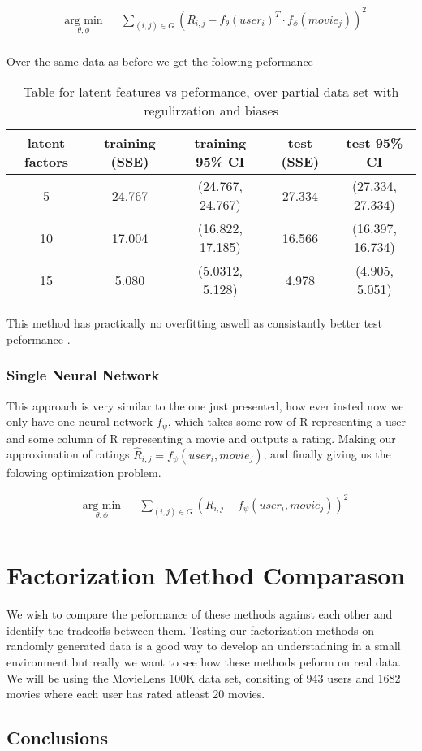 \documentclass{article}
\begin{document}
\begin{equation*}
\begin{aligned}
& \underset{\theta, \phi}{\text{arg min}}
& & \sum_{(i,j) \in G} (R_{i,j} - f_{\theta}(user_i)^T \cdot f_{\phi}(movie_j))^2  \\
\end{aligned}
\end{equation*}

Over the same data as before  we get the folowing peformance

\begin{table}[H]
\centering
\begin{tabular}{| c | c | c | c | c |}
\hline
latent factors & training (SSE) &  training 95\% CI & test (SSE) &  test 95\% CI  \\
\hline
\hline
5 & 24.767 & (24.767, 24.767)  & 27.334 & (27.334, 27.334)\\
10 & 17.004 & (16.822, 17.185) & 16.566 & (16.397, 16.734)\\
15 & 5.080 & (5.0312, 5.128) & 4.978 & (4.905, 5.051)\\
\hline
\end{tabular}
\caption{Table for latent features vs peformance, over partial data set with regulirzation and biases}
\end{table}

This method has practically no overfitting aswell as consistantly better test peformance .

\subsubsection{Single Neural Network}
This approach is very similar to the one just presented, how ever insted now we only have one neural network $f_{\psi}$, which takes some row of R representing a user and some column of R representing a movie and outputs a rating. Making our approximation of ratings $\hat{R}_{i,j} = f_{\psi}(user_i, movie_j)$, and finally giving us the folowing optimization problem.

\begin{equation*}
\begin{aligned}
& \underset{\theta, \phi}{\text{arg min}}
& & \sum_{(i,j) \in G} (R_{i,j} - f_{\psi}(user_i, movie_j))^2  \\
\end{aligned}
\end{equation*}


\section{Factorization Method Comparason}
We wish to compare the peformance of these methods against each other and identify the tradeoffs between them. Testing our factorization methods on randomly generated data is a good way to develop an understadning in a small environment but really we want to see how these methods peform on real data. We will be using the MovieLens 100K data set, consiting of 943 users and 1682 movies where each user has rated atleast 20 movies.


\subsection{Conclusions}
\end{document}
